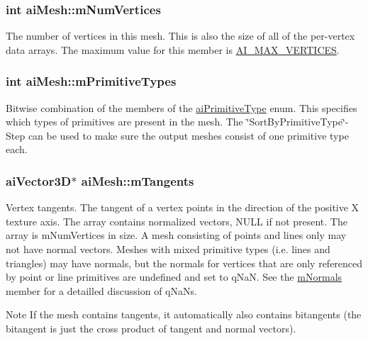 \hypertarget{structai_mesh_ab34b7b5941e6636f1c08f615cbb072ef}{
\subsubsection[{m\-Num\-Vertices}]{ {\bf int} ai\-Mesh\-::m\-Num\-Vertices}}\label{structai_mesh_ab34b7b5941e6636f1c08f615cbb072ef}
The number of vertices in this mesh. This is also the size of all of the per-\/vertex data arrays. The maximum value for this member is \hyperlink{ai_mesh_8h_aa3997d5751b93f15e4c9d86ced093b56}{A\-I\-\_\-\-M\-A\-X\-\_\-\-V\-E\-R\-T\-I\-C\-E\-S}. \hypertarget{structai_mesh_a99d66ac0a444068c1b252b30265cbf53}{
\subsubsection[{m\-Primitive\-Types}]{ {\bf int} ai\-Mesh\-::m\-Primitive\-Types}}\label{structai_mesh_a99d66ac0a444068c1b252b30265cbf53}
Bitwise combination of the members of the \hyperlink{ai_mesh_8h_ac352902280db7c3bd8ba64c133b7f03f}{ai\-Primitive\-Type} enum. This specifies which types of primitives are present in the mesh. The \char`\"{}\-Sort\-By\-Primitive\-Type\char`\"{}-\/\-Step can be used to make sure the output meshes consist of one primitive type each. \hypertarget{structai_mesh_af367ff78bd69f3e83d7edc8ad67dc5df}{
\subsubsection[{m\-Tangents}]{ {\bf ai\-Vector3\-D}$\ast$ ai\-Mesh\-::m\-Tangents}}\label{structai_mesh_af367ff78bd69f3e83d7edc8ad67dc5df}
Vertex tangents. The tangent of a vertex points in the direction of the positive X texture axis. The array contains normalized vectors, N\-U\-L\-L if not present. The array is m\-Num\-Vertices in size. A mesh consisting of points and lines only may not have normal vectors. Meshes with mixed primitive types (i.\-e. lines and triangles) may have normals, but the normals for vertices that are only referenced by point or line primitives are undefined and set to q\-Na\-N. See the \hyperlink{structai_mesh_aec81b496b4d93838cef038933dabe9b9}{m\-Normals} member for a detailled discussion of q\-Na\-Ns. \begin{DoxyNote}{Note}
If the mesh contains tangents, it automatically also contains bitangents (the bitangent is just the cross product of tangent and normal vectors). 
\end{DoxyNote}
